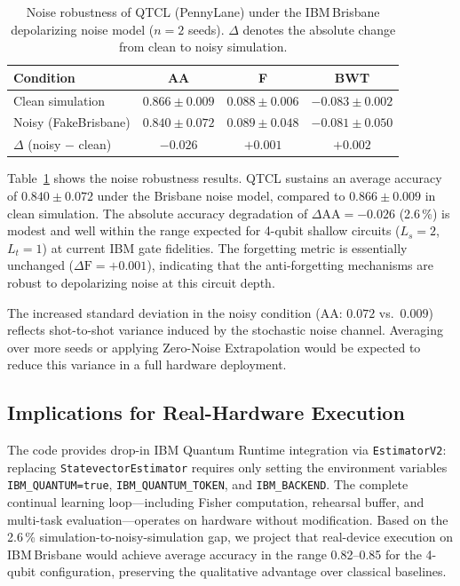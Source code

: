 \documentclass[a4paper,nopdfoutputerror]{quantumarticle}
\begin{document}
\begin{table}[t]
  \centering
  \caption{Noise robustness of QTCL (PennyLane) under the IBM\,Brisbane
           depolarizing noise model ($n=2$ seeds).
           $\Delta$ denotes the absolute change from clean to noisy simulation.}
  \label{tab:noise}
  \small
  \begin{tabular}{lccc}
    \toprule
    Condition & AA & F & BWT \\
    \midrule
    Clean simulation    & $0.866\pm0.009$ & $0.088\pm0.006$ & $-0.083\pm0.002$ \\
    Noisy (FakeBrisbane)& $0.840\pm0.072$ & $0.089\pm0.048$ & $-0.081\pm0.050$ \\
    \midrule
    $\Delta$ (noisy $-$ clean) & $-0.026$ & $+0.001$ & $+0.002$ \\
    \bottomrule
  \end{tabular}
\end{table}

Table~\ref{tab:noise} shows the noise robustness results.
QTCL sustains an average accuracy of $0.840 \pm 0.072$ under the Brisbane
noise model, compared to $0.866 \pm 0.009$ in clean simulation.
The absolute accuracy degradation of $\Delta\mathrm{AA} = -0.026$ (2.6\,\%)
is modest and well within the range expected for 4-qubit shallow circuits
($L_s = 2$, $L_t = 1$) at current IBM gate fidelities.
The forgetting metric is essentially unchanged ($\Delta\mathrm{F} = +0.001$),
indicating that the anti-forgetting mechanisms are robust to depolarizing noise
at this circuit depth.

The increased standard deviation in the noisy condition (AA: $0.072$ vs.\
$0.009$) reflects shot-to-shot variance induced by the stochastic noise channel.
Averaging over more seeds or applying Zero-Noise Extrapolation would be expected
to reduce this variance in a full hardware deployment.

\subsection{Implications for Real-Hardware Execution}

The code provides drop-in IBM Quantum Runtime integration via
\texttt{EstimatorV2}: replacing \texttt{StatevectorEstimator} requires only
setting the environment variables \texttt{IBM\_QUANTUM=true},
\texttt{IBM\_QUANTUM\_TOKEN}, and \texttt{IBM\_BACKEND}.
The complete continual learning loop---including Fisher computation, rehearsal
buffer, and multi-task evaluation---operates on hardware without modification.
Based on the 2.6\,\% simulation-to-noisy-simulation gap, we project that
real-device execution on IBM\,Brisbane would achieve average accuracy
in the range 0.82--0.85 for the 4-qubit configuration, preserving the
qualitative advantage over classical baselines.
\end{document}
